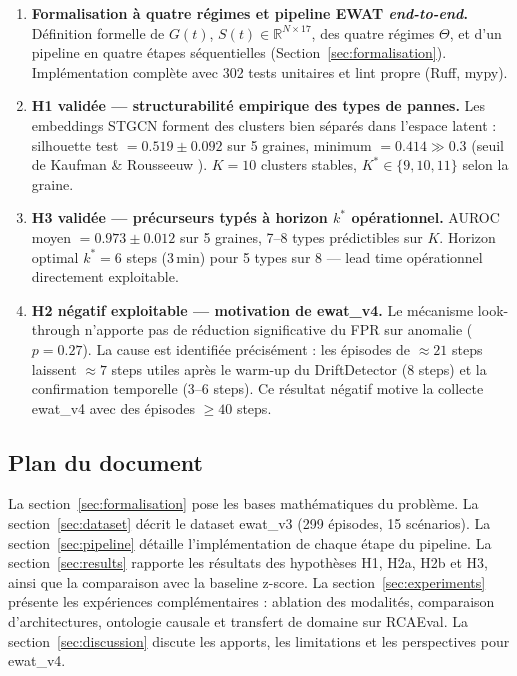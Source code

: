 \begin{enumerate}
  \item \textbf{Formalisation à quatre régimes et pipeline EWAT \textit{end-to-end}.}
    Définition formelle de $G(t)$, $S(t) \in \mathbb{R}^{N \times 17}$,
    des quatre régimes $\Theta$, et d'un pipeline en quatre étapes séquentielles
    (Section~\ref{sec:formalisation}). Implémentation complète avec 302 tests unitaires
    et lint propre (Ruff, mypy).

  \item \textbf{H1 validée --- structurabilité empirique des types de pannes.}
    Les embeddings STGCN forment des clusters bien séparés dans l'espace latent :
    silhouette test $= 0.519 \pm 0.092$ sur 5 graines, minimum $= 0.414 \gg 0.3$
    (seuil de Kaufman \& Rousseeuw \cite{kaufman1990}).
    $K = 10$ clusters stables, $K^* \in \{9, 10, 11\}$ selon la graine.

  \item \textbf{H3 validée --- précurseurs typés à horizon $k^*$ opérationnel.}
    AUROC moyen $= 0.973 \pm 0.012$ sur 5 graines, 7--8 types prédictibles sur $K$.
    Horizon optimal $k^* = 6$ steps (3\,min) pour 5 types sur 8 --- lead time opérationnel
    directement exploitable.

  \item \textbf{H2 négatif exploitable --- motivation de ewat\_v4.}
    Le mécanisme look-through n'apporte pas de réduction significative du FPR sur anomalie
    ($p = 0.27$). La cause est identifiée précisément : les épisodes de $\approx 21$ steps
    laissent $\approx 7$ steps utiles après le warm-up du DriftDetector (8 steps) et la
    confirmation temporelle (3--6 steps). Ce résultat négatif motive la collecte ewat\_v4
    avec des épisodes $\geq 40$ steps.
\end{enumerate}

\subsection{Plan du document}

La section~\ref{sec:formalisation} pose les bases mathématiques du problème.
La section~\ref{sec:dataset} décrit le dataset ewat\_v3 (299 épisodes, 15 scénarios).
La section~\ref{sec:pipeline} détaille l'implémentation de chaque étape du pipeline.
La section~\ref{sec:results} rapporte les résultats des hypothèses H1, H2a, H2b et H3,
ainsi que la comparaison avec la baseline z-score.
La section~\ref{sec:experiments} présente les expériences complémentaires : ablation des
modalités, comparaison d'architectures, ontologie causale et transfert de domaine sur RCAEval.
La section~\ref{sec:discussion} discute les apports, les limitations et les perspectives
pour ewat\_v4.
